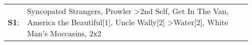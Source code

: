 \begin{supertabular}{p{0.03\textwidth}p{0.92\textwidth}}
 \textbf{S1}:  &  Syncopated Strangers\textsuperscript{}, \enspace Prowler\textsuperscript{} \textgreater \enspace 2nd Self\textsuperscript{}, \enspace Get In The Van\textsuperscript{}, \enspace America the Beautiful[1]\textsuperscript{}, \enspace Uncle Wally[2]\textsuperscript{} \textgreater \enspace Water[2]\textsuperscript{}, \enspace White Man's Moccasins\textsuperscript{}, \enspace 2x2\textsuperscript{}  \enspace  \\
\end{supertabular}
